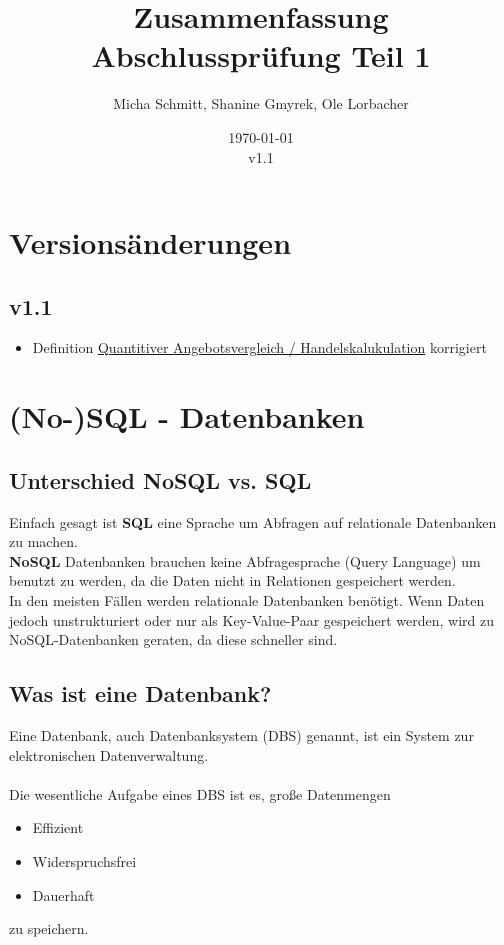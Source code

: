 \documentclass[10pt]{article}
\title{Zusammenfassung Abschlussprüfung Teil 1}
\author{Micha Schmitt, Shanine Gmyrek, Ole Lorbacher}
\date{\today \\ v1.1}
\begin{document}
\maketitle
\vspace{2cm}
\tableofcontents

\pagebreak
\setcounter{page}{1}
\setcounter{section}{-1}
\section{Versionsänderungen}
\subsection{v1.1}
\begin{itemize}
	\item Definition \hyperref[sec:Handelskalkulation]{Quantitiver Angebotsvergleich / Handelskalukulation} korrigiert
\end{itemize}

\section{(No-)SQL - Datenbanken}

\subsection{Unterschied NoSQL vs. SQL}
Einfach gesagt ist \textbf{SQL} eine Sprache um Abfragen auf relationale Datenbanken zu machen. \\
\textbf{NoSQL} Datenbanken brauchen keine Abfragesprache (Query Language) um benutzt zu werden, da die Daten nicht in Relationen gespeichert werden. \\
In den meisten Fällen werden relationale Datenbanken benötigt. Wenn Daten jedoch unstrukturiert oder nur als Key-Value-Paar gespeichert werden, wird zu NoSQL-Datenbanken geraten, da diese schneller sind.

\subsection{Was ist eine Datenbank?}

Eine Datenbank, auch Datenbanksystem (DBS) genannt, ist ein System zur elektronischen Datenverwaltung. \\ \\
Die wesentliche Aufgabe eines DBS ist es, große Datenmengen 
\begin{itemize}
\item Effizient
\item Widerspruchsfrei
\item Dauerhaft
\end{itemize} 
zu speichern.
\end{document}
